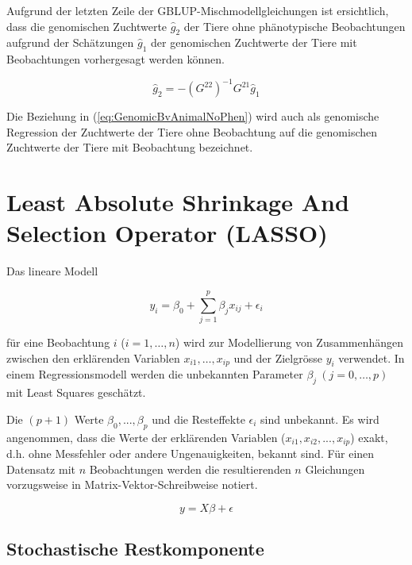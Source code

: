 \documentclass[]{book}
\begin{document}
Aufgrund der letzten Zeile der GBLUP-Mischmodellgleichungen ist
ersichtlich, dass die genomischen Zuchtwerte \(\hat{g}_2\) der Tiere
ohne phänotypische Beobachtungen aufgrund der Schätzungen \(\hat{g}_1\)
der genomischen Zuchtwerte der Tiere mit Beobachtungen vorhergesagt
werden können.

\begin{equation}
\hat{g}_2 = -\left( G^{22}\right)^{-1}G^{21}\hat{g}_1
\label{eq:GenomicBvAnimalNoPhen}
\end{equation}

Die Beziehung in (\ref{eq:GenomicBvAnimalNoPhen}) wird auch als
genomische Regression der Zuchtwerte der Tiere ohne Beobachtung auf die
genomischen Zuchtwerte der Tiere mit Beobachtung bezeichnet.

\chapter{Least Absolute Shrinkage And Selection Operator
(LASSO)}\label{chpt-lasso}

Das lineare Modell

\begin{equation}
y_i = \beta_0 + \sum_{j=1}^p \beta_jx_{ij} + \epsilon_i
\label{eq:StandardLinMod}
\end{equation}

für eine Beobachtung \(i\) (\(i=1,\ldots,n\)) wird zur Modellierung von
Zusammenhängen zwischen den erklärenden Variablen
\(x_{i1},\ldots,x_{ip}\) und der Zielgrösse \(y_i\) verwendet. In einem
Regressionsmodell werden die unbekannten Parameter
\(\beta_j \ (j=0,\ldots,p)\) mit Least Squares geschätzt.

Die \((p+1)\) Werte \(\beta_0, ..., \beta_p\) und die Resteffekte
\(\epsilon_i\) sind unbekannt. Es wird angenommen, dass die Werte der
erklärenden Variablen (\(x_{i1}, x_{i2}, ..., x_{ip}\)) exakt, d.h. ohne
Messfehler oder andere Ungenauigkeiten, bekannt sind. Für einen
Datensatz mit \(n\) Beobachtungen werden die resultierenden \(n\)
Gleichungen vorzugsweise in Matrix-Vektor-Schreibweise notiert.

\begin{equation}
y = X\beta + \epsilon
\label{eq:StandardLinearModelMatrixVektor}
\end{equation}

\section{Stochastische
Restkomponente}\label{stochastische-restkomponente}
\end{document}
